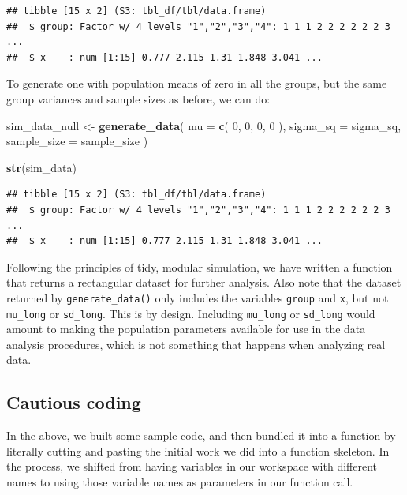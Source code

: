 \documentclass[
]{book}
\newenvironment{Shaded}{\begin{snugshade}}{\end{snugshade}}
\newcommand{\AttributeTok}[1]{\textcolor[rgb]{0.13,0.29,0.53}{#1}}
\newcommand{\DecValTok}[1]{\textcolor[rgb]{0.00,0.00,0.81}{#1}}
\newcommand{\FunctionTok}[1]{\textcolor[rgb]{0.13,0.29,0.53}{\textbf{#1}}}
\newcommand{\NormalTok}[1]{#1}
\newcommand{\OtherTok}[1]{\textcolor[rgb]{0.56,0.35,0.01}{#1}}
\begin{document}
\begin{verbatim}
## tibble [15 x 2] (S3: tbl_df/tbl/data.frame)
##  $ group: Factor w/ 4 levels "1","2","3","4": 1 1 1 2 2 2 2 2 2 3 ...
##  $ x    : num [1:15] 0.777 2.115 1.31 1.848 3.041 ...
\end{verbatim}

To generate one with population means of zero in all the groups, but the same group variances and sample sizes as before, we can do:

\begin{Shaded}
\begin{Highlighting}[]
\NormalTok{sim\_data\_null }\OtherTok{\textless{}{-}} \FunctionTok{generate\_data}\NormalTok{(}
  \AttributeTok{mu =} \FunctionTok{c}\NormalTok{( }\DecValTok{0}\NormalTok{, }\DecValTok{0}\NormalTok{, }\DecValTok{0}\NormalTok{, }\DecValTok{0}\NormalTok{ ),}
  \AttributeTok{sigma\_sq =}\NormalTok{ sigma\_sq, }
  \AttributeTok{sample\_size =}\NormalTok{ sample\_size}
\NormalTok{)}

\FunctionTok{str}\NormalTok{(sim\_data)}
\end{Highlighting}
\end{Shaded}

\begin{verbatim}
## tibble [15 x 2] (S3: tbl_df/tbl/data.frame)
##  $ group: Factor w/ 4 levels "1","2","3","4": 1 1 1 2 2 2 2 2 2 3 ...
##  $ x    : num [1:15] 0.777 2.115 1.31 1.848 3.041 ...
\end{verbatim}

Following the principles of tidy, modular simulation, we have written a function that returns a rectangular dataset for further analysis.
Also note that the dataset returned by \texttt{generate\_data()} only includes the variables \texttt{group} and \texttt{x}, but not \texttt{mu\_long} or \texttt{sd\_long}.
This is by design.
Including \texttt{mu\_long} or \texttt{sd\_long} would amount to making the population parameters available for use in the data analysis procedures, which is not something that happens when analyzing real data.

\subsection{Cautious coding}\label{cautious-coding}

In the above, we built some sample code, and then bundled it into a function by literally cutting and pasting the initial work we did into a function skeleton.
In the process, we shifted from having variables in our workspace with different names to using those variable names as parameters in our function call.
\end{document}
